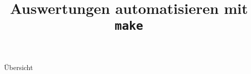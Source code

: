 

\title[\texttt{make}]{Auswertungen automatisieren mit \texttt{make}}



{
  \begin{frame}
    \titlepage
  \end{frame}
}

\begin{frame}{Übersicht}
  \tableofcontents
\end{frame}




